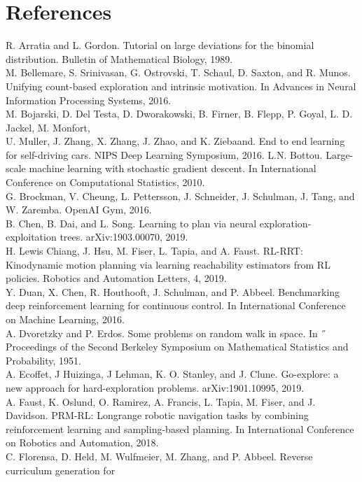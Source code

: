 \documentclass{article}
\newcounter{n}
\begin{document}
\section*{References}
R. Arratia and L. Gordon. Tutorial on large deviations for the binomial distribution. Bulletin of
Mathematical Biology, 1989. \\
M. Bellemare, S. Srinivasan, G. Ostrovski, T. Schaul, D. Saxton, and R. Munos. Unifying count-based
exploration and intrinsic motivation. In Advances in Neural Information Processing Systems, 2016.\\
M. Bojarski, D. Del Testa, D. Dworakowski, B. Firner, B. Flepp, P. Goyal, L. D. Jackel, M. Monfort,\\
U. Muller, J. Zhang, X. Zhang, J. Zhao, and K. Ziebaand. End to end learning for self-driving cars.
NIPS Deep Learning Symposium, 2016.
L.N. Bottou. Large-scale machine learning with stochastic gradient descent. In International\\
Conference on Computational Statistics, 2010.\\
G. Brockman, V. Cheung, L. Pettersson, J. Schneider, J. Schulman, J. Tang, and W. Zaremba. OpenAI
Gym, 2016.\\
B. Chen, B. Dai, and L. Song. Learning to plan via neural exploration-exploitation trees.
arXiv:1903.00070, 2019.\\
H. Lewis Chiang, J. Hsu, M. Fiser, L. Tapia, and A. Faust. RL-RRT: Kinodynamic motion planning
via learning reachability estimators from RL policies. Robotics and Automation Letters, 4, 2019.\\
Y. Duan, X. Chen, R. Houthooft, J. Schulman, and P. Abbeel. Benchmarking deep reinforcement
learning for continuous control. In International Conference on Machine Learning, 2016.\\
A. Dvoretzky and P. Erdos. Some problems on random walk in space. In ˝ Proceedings of the Second
Berkeley Symposium on Mathematical Statistics and Probability, 1951.\\
A. Ecoffet, J Huizinga, J Lehman, K. O. Stanley, and J. Clune. Go-explore: a new approach for
hard-exploration problems. arXiv:1901.10995, 2019.\\
A. Faust, K. Oslund, O. Ramirez, A. Francis, L. Tapia, M. Fiser, and J. Davidson. PRM-RL: Longrange robotic navigation tasks by combining reinforcement learning and sampling-based planning.
In International Conference on Robotics and Automation, 2018.\\
C. Florensa, D. Held, M. Wulfmeier, M. Zhang, and P. Abbeel. Reverse curriculum generation for
\end{document}
